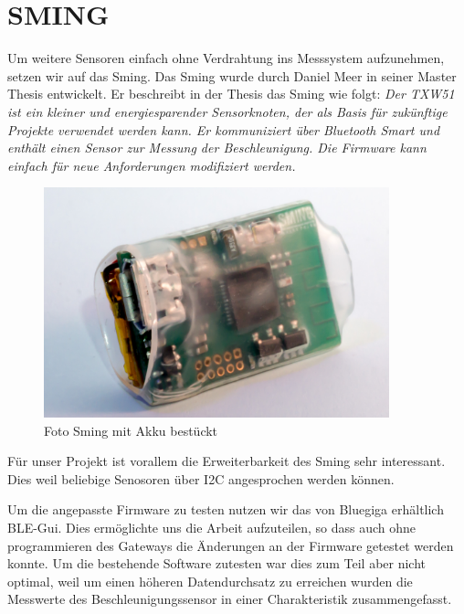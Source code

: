 \chapter{SMING}\label{sec:sming}
Um weitere Sensoren einfach ohne Verdrahtung ins Messsystem aufzunehmen, setzen wir auf das Sming. Das Sming wurde durch Daniel Meer in seiner Master Thesis entwickelt. Er beschreibt in der Thesis das Sming wie folgt: \textit{Der TXW51 ist ein kleiner und energiesparender Sensorknoten, der als Basis für zukünftige Projekte verwendet werden kann. Er kommuniziert über Bluetooth Smart und enthält einen Sensor zur Messung der Beschleunigung. Die Firmware kann einfach für neue Anforderungen modifiziert werden.}\cite{meer:masterthesis}

\begin{figure}[hbtp]
	\center
	\includegraphics[width=10cm]{bilder/foto-6.jpg}
	\caption{Foto Sming mit Akku bestückt}
	\label{fig:sming}
\end{figure}

Für unser Projekt ist vorallem die Erweiterbarkeit des Sming sehr interessant. Dies weil beliebige Senosoren über I2C angesprochen werden können.

Um die angepasste Firmware zu testen nutzen wir das von Bluegiga erhältlich BLE-Gui. Dies ermöglichte uns die Arbeit aufzuteilen, so dass auch ohne programmieren des Gateways die Änderungen an der Firmware getestet werden konnte. Um die bestehende Software zutesten war dies zum Teil aber nicht optimal, weil um einen höheren Datendurchsatz zu erreichen wurden die Messwerte des Beschleunigungssensor in einer Charakteristik zusammengefasst.


